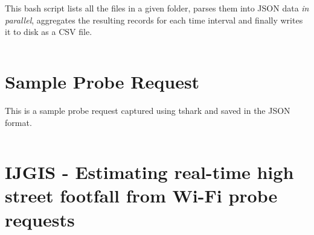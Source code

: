 This bash script lists all the files in a given folder, parses them into JSON data \textit{in parallel}, aggregates the resulting records for each time interval and finally writes it to disk as a CSV file.
\vspace{1em}
\inputminted{bash}{analysis/data-toolkit/new-toolkit-parallel.sh}

\section{Sample Probe Request} \label{appendix:sampleprobe}
This is a sample probe request captured using tshark and saved in the JSON format.

\vspace{1em}
\inputminted{javascript}{analysis/data-collection/samplepacket.json}


\section{IJGIS - Estimating real-time high street footfall from Wi-Fi probe requests} \label{appendix:ijgis-paper}
\lipsum[1]

